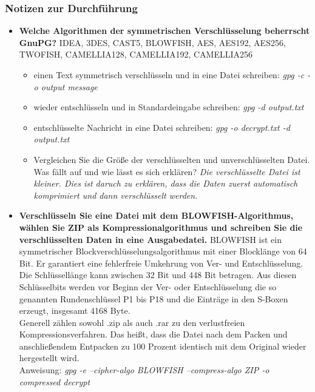 \documentclass[12pt,a4paper]{article}
\begin{document}
\subsubsection{Notizen zur Durchführung}
\begin{itemize}
    \item \textbf{Welche Algorithmen der symmetrischen Verschlüsselung beherrscht GnuPG?} IDEA, 3DES, CAST5, BLOWFISH, AES, AES192, AES256, TWOFISH, CAMELLIA128, CAMELLIA192, CAMELLIA256
    \begin{itemize}
        \item einen Text symmetrisch verschlüsseln und in eine Datei schreiben:  \textit{gpg -c -o output message}
        \item wieder entschlüsseln und in Standardeingabe schreiben: \textit{gpg -d output.txt}
        \item entschlüsselte Nachricht in eine Datei schreiben: \textit{gpg -o decrypt.txt -d output.txt}
        \item Vergleichen Sie die Größe der verschlüsselten und unverschlüsselten Datei. Was fällt auf und wie lässt es sich erklären? \textit{Die verschlüsselte Datei ist kleiner. Dies ist daruch zu erklären, dass die Daten zuerst automatisch komprimiert und dann verschlüsselt werden. }
    \end{itemize}
    
    \item \textbf{Verschlüsseln Sie eine Datei mit dem BLOWFISH-Algorithmus, wählen Sie ZIP als Kompressionalgorithmus und schreiben Sie die verschlüsselten Daten in eine Ausgabedatei.}
    BLOWFISH ist ein symmetrischer Blockverschlüsselungsalgorithmus mit einer Blocklänge von 64 Bit. Er garantiert eine fehlerfreie Umkehrung von Ver- und Entschlüsselung. Die Schlüssellänge kann zwischen 32 Bit und 448 Bit betragen. Aus diesen Schlüsselbits werden vor Beginn der Ver- oder Entschlüsselung die so genannten Rundenschlüssel P1 bis P18 und die Einträge in den S-Boxen erzeugt, insgesamt 4168 Byte.\\
    Generell zählen sowohl .zip als auch .rar zu den verlustfreien Kompressionsverfahren. Das heißt, dass die Datei nach dem Packen und anschließendem Entpacken zu 100 Prozent identisch mit dem Original wieder hergestellt wird. \\

    Anweisung: \textit{gpg -e --cipher-algo BLOWFISH --compress-algo ZIP -o compressed decrypt}
    

\end{itemize}
\end{document}
